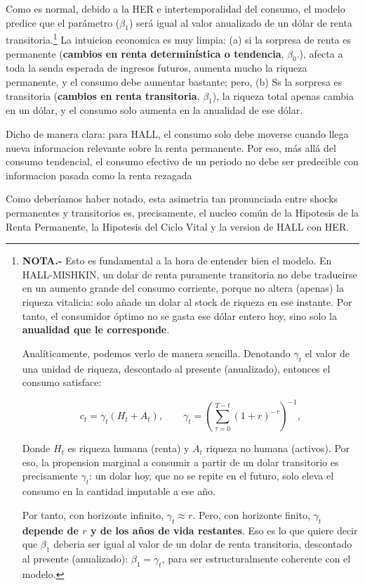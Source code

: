 \documentclass[10pt,a4paper]{article}
\begin{document}
Como es normal, debido a la HER e intertemporalidad del consumo, el modelo predice que el parámetro ($\beta_1$) será igual al valor anualizado de un dólar de renta transitoria.\footnote{%
  \textbf{NOTA.-} Esto es fundamental a la hora de entender bien el modelo. En HALL-MISHKIN, un dolar de renta puramente transitoria no debe traducirse en un aumento grande del consumo corriente, porque no altera (apenas) la riqueza vitalicia: solo añade un dolar al stock de riqueza en ese instante. Por tanto, el consumidor óptimo no se gasta ese dólar entero hoy, sino solo la \textbf{anualidad que le corresponde}. 

  Analíticamente, podemos verlo de manera sencilla. Denotando $\gamma_t$ el valor de una unidad de riqueza, descontado al presente (anualizado), entonces el consumo satisface: 

  $$c_t=\gamma_t(H_t+A_t), \qquad \gamma_t=\left(\sum_{\tau=0}^{T-t}(1+r)^{-\tau}\right)^{-1},$$

  Donde $H_t$ es riqueza humana (renta) y $A_t$ riqueza no humana (activos). Por eso, la propension marginal a consumir a partir de un dolar transitorio es precisamente $\gamma_t$: un dolar hoy, que no se repite en el futuro, solo eleva el consumo en la cantidad imputable a ese año. 
      
  Por tanto, con horizonte infinito, $\gamma_t\approx r$. Pero, con horizonte finito, \textbf{$\gamma_t$ depende de $r$ y de los años de vida restantes}. Eso es lo que quiere decir que $\beta_1$ deberia ser igual al valor de un dolar de renta transitoria, descontado al presente (anualizado): $\beta_1=\gamma_t$, para ser estructuralmente coherente con el modelo.
} La intuicion economica es muy limpia: (a) si la sorpresa de renta es permanente (\textbf{cambios en renta determinística o tendencia}, $\beta_0$.), afecta a toda la senda esperada de ingresos futuros, aumenta mucho la riqueza permanente, y  el consumo debe aumentar bastante; pero, (b) Ss la sorpresa es transitoria (\textbf{cambios en renta transitoria}, $\beta_1$), la riqueza total apenas cambia en un dólar, y el consumo solo aumenta en la anualidad de ese dólar. 

Dicho de manera clara: para HALL, el consumo solo debe moverse cuando llega nueva informacion relevante sobre la renta permanente. Por eso, más allá del consumo tendencial, el consumo efectivo de un periodo no debe ser predecible con informacion pasada como la renta rezagada
    
Como deberíamos haber notado, esta asimetria tan pronunciada entre shocks permanentes y transitorios es, precisamente, el nucleo común de la Hipotesis de la Renta Permanente, la Hipotesis del Ciclo Vital y la version de HALL con HER. 
\end{document}
